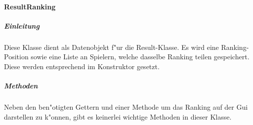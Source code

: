 \paragraph{ResultRanking}
\label{par:resultRanking}

\subparagraph{Einleitung}
Diese Klasse dient als Datenobjekt f"ur die Result-Klasse. Es wird eine Ranking-Position sowie eine Liste an Spielern, welche dasselbe Ranking teilen gespeichert. Diese werden entsprechend im Konstruktor gesetzt. 

\subparagraph{Methoden}
Neben den ben"otigten Gettern und einer Methode um das Ranking auf der Gui darstellen zu k"onnen, gibt es keinerlei wichtige Methoden in dieser Klasse. 